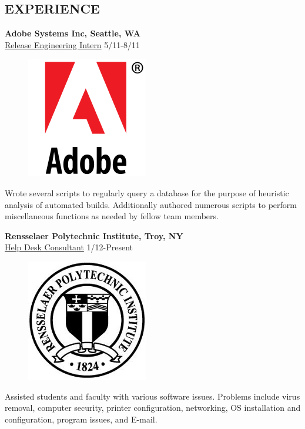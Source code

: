 \documentclass[margin,11pt]{res} %
\begin{document}
\begin{resume}
\section{EXPERIENCE}     {\bf Adobe Systems Inc, Seattle, WA}  \\
                  \underline{Release Engineering Intern} \hfill 5/11-8/11

\begin{figure} %
\centering
\hspace{-1in}\includegraphics[scale=0.15]{adobe.png}
\end{figure}
              Wrote several scripts to regularly query a database for the purpose of heuristic analysis of automated builds. Additionally authored numerous scripts to perform miscellaneous functions as needed by fellow team members.      

                {\bf Rensselaer Polytechnic Institute, Troy, NY} \\
                  \underline{Help Desk Consultant} \hfill 1/12-Present

\begin{figure}
\centering
\hspace{-0.9in}\includegraphics[scale=0.25]{rpi.png}
\end{figure}
                Assisted students and faculty with various software issues. Problems include virus removal, computer security, printer configuration, networking, OS installation and configuration, program issues, and E-mail.
\end{resume} 
\end{document}

